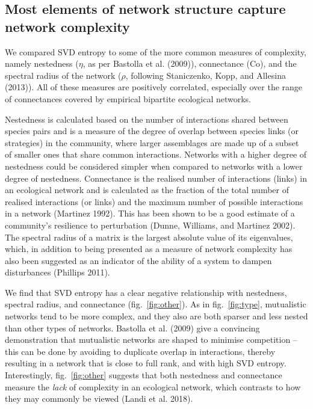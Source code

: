 \documentclass[10pt,oneside]{article}
\begin{document}
\hypertarget{most-elements-of-network-structure-capture-network-complexity}{%
\subsection{Most elements of network structure capture network
complexity}\label{most-elements-of-network-structure-capture-network-complexity}}

We compared SVD entropy to some of the more common measures of
complexity, namely nestedness (\(\eta\), as per Bastolla et al. (2009)),
connectance (\(\text{Co}\)), and the spectral radius of the network
(\(\rho\), following Staniczenko, Kopp, and Allesina (2013)). All of
these measures are positively correlated, especially over the range of
connectances covered by empirical bipartite ecological networks.

Nestedness is calculated based on the number of interactions shared
between species pairs and is a measure of the degree of overlap between
species links (or strategies) in the community, where larger assemblages
are made up of a subset of smaller ones that share common interactions.
Networks with a higher degree of nestedness could be considered simpler
when compared to networks with a lower degree of nestedness. Connectance
is the realised number of interactions (links) in an ecological network
and is calculated as the fraction of the total number of realised
interactions (or links) and the maximum number of possible interactions
in a network (Martinez 1992). This has been shown to be a good estimate
of a community's resilience to perturbation (Dunne, Williams, and
Martinez 2002). The spectral radius of a matrix is the largest absolute
value of its eigenvalues, which, in addition to being presented as a
measure of network complexity has also been suggested as an indicator of
the ability of a system to dampen disturbances (Phillips 2011).

We find that SVD entropy has a clear negative relationship with
nestedness, spectral radius, and connectance (fig.~\ref{fig:other}). As
in fig.~\ref{fig:type}, mutualistic networks tend to be more complex,
and they also are both sparser and less nested than other types of
networks. Bastolla et al. (2009) give a convincing demonstration that
mutualistic networks are shaped to minimise competition -- this can be
done by avoiding to duplicate overlap in interactions, thereby resulting
in a network that is close to full rank, and with high SVD entropy.
Interestingly, fig.~\ref{fig:other} suggests that both nestedness and
connectance measure the \emph{lack} of complexity in an ecological
network, which contrasts to how they may commonly be viewed (Landi et
al. 2018).
\end{document}
